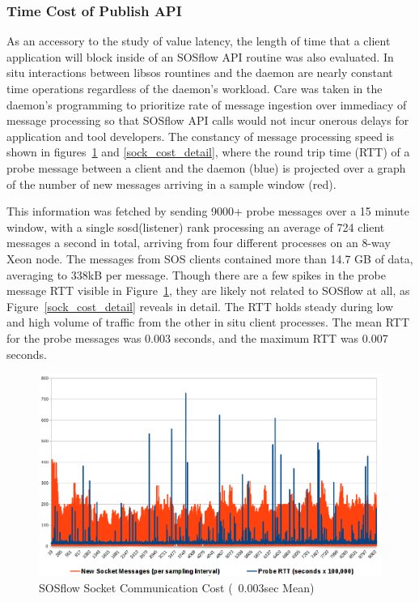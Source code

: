 \subsubsection{Time Cost of Publish API} %
%
As an accessory to the study of value latency, the length of time that
a client application will block inside of an SOSflow API routine was
also evaluated.
%
In situ interactions between libsos rountines and the daemon are
nearly constant time operations regardless of the daemon's workload.
%
Care was taken in the daemon's programming to prioritize rate of message
ingestion over immediacy of message processing so that SOSflow API calls
would not incur onerous delays for application and tool developers.
%
The constancy of message processing speed is shown in
figures~\ref{sock_cost} and \ref{sock_cost_detail}, where the round
trip time (RTT) of a probe message between a client and the daemon
(blue) is projected over a graph of the number of new messages
arriving in a sample window (red).
%
\par
%
This information was fetched by sending 9000+ probe messages over a 15
minute window, with a single sosd(listener) rank processing an average
of 724 client messages a second in total, arriving from four different
processes on an 8-way Xeon node.
%
The messages from SOS clients contained more than 14.7 GB of data,
averaging to 338kB per message.
%
Though there are a few spikes in the probe message RTT visible in
Figure~\ref{sock_cost}, they are likely not related to SOSflow at all,
as Figure~\ref{sock_cost_detail} reveals in detail.
%
The RTT holds steady during low and high volume of traffic from the
other in situ client processes.
%
The mean RTT for the probe messages was 0.003 seconds, and the maximum
RTT was 0.007 seconds.
\begin{figure}[h]
\centering
\includegraphics[width=\columnwidth]{images/icebox_api_cost_when_slam.png}
\caption{SOSflow Socket Communication Cost (~0.003sec Mean)}
\label{sock_cost}
\end{figure}

